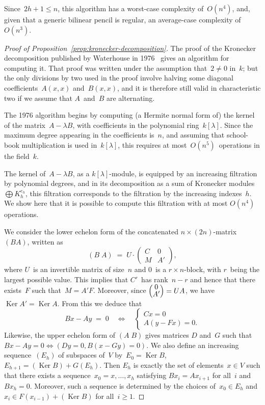 \documentclass{lms}
\def\mat#1{\begin{pmatrix}#1\end{pmatrix}}
\def\smat{\def\arraystretch{.66}\mat}
\DeclareMathOperator\Ker{Ker}
\begin{document}
Since~$2h+1 ≤ n$, this algorithm has a worst-case complexity of~$O(n^4)$,
and, given that a generic bilinear pencil is regular,
an average-case complexity of~$O(n^3)$.

\begin{proof}[Proof of Proposition~\ref{prop:kronecker-decomposition}]
The proof of the Kronecker decomposition published
by Waterhouse in 1976~\cite[Theorem 3.1]{inventiones1976waterhouse}
gives an algorithm for computing it.
That proof was written under the assumption that~$2 ≠ 0$ in~$k$;
but the only divisions by two used in the proof
involve halving some diagonal coefficients~$A(x,x)$ and~$B(x,x)$,
and it is therefore still valid in characteristic two
if we assume that $A$~and~$B$ are alternating.

\medbreak

The 1976 algorithm begins by computing (a Hermite normal form of)
the kernel of the matrix~$A - λ B$,
with coefficients in the polynomial ring~$k[λ]$.
Since the maximum degree appearing in the coefficients is~$n$,
and assuming that school-book multiplication is used in~$k[λ]$,
this requires at most~$O(n^5)$~operations in the field~$k$.

The kernel of~$A - λ B$, as a $k[λ]$-module,
is equipped by an increasing filtration by polynomial degrees,
and in its decomposition as a sum of Kronecker modules~$⨁ K_h^{e_h}$,
this filtration corresponds to the filtration by the increasing
indexes~$h$.
We show here that it is possible to compute this filtration
with at most $O(n^4)$ operations.

\medbreak

We consider the lower echelon form
of the concatenated $n × (2n)$-matrix $(B A)$, written as
\begin{equation}
(B \; A) \;=\; U · \mat{C & 0 \\ M & A'},
\end{equation}
where $U$~is an invertible matrix of size~$n$
and $0$~is a $r × n$-block, with $r$~being the largest possible value.
This implies that $C'$~has rank~$n-r$ and hence that
there exists~$F$ such that~$M = A' F$.
Moreover, since $\smat{0\\A'} = U A$, we have~$\Ker A' = \Ker A$.
From this we deduce that
\begin{equation}
B x - A y \;=\; 0 \quad ⇔ \quad
  \begin{cases} C x = 0 \\ A (y - F x) = 0.\end{cases}
\end{equation}
Likewise, the upper echelon form of $(A\;B)$
gives matrices $D$ and~$G$ such that
$B x - A y = 0 ⇔ (D y = 0, B (x - G y) = 0)$.
We also define an increasing sequence~$(E_h)$ of subspaces of~$V$
by~$E_0 = \Ker B$, $E_{h+1} = (\Ker B) + G(E_h)$.
Then $E_h$ is exactly the set of elements~$x ∈ V$ such that there exists
a sequence~$x_0 = x, …, x_h$ satisfying $B x_i = A x_{i+1}$ for all~$i$
and~$B x_h = 0$.
Moreover, such a sequence is determined by the choices
of~$x_0 ∈ E_h$ and~$x_{i} ∈ F(x_{i-1}) + (\Ker B)$ for all~$i ≥ 1$.


\end{proof}
\end{document}
